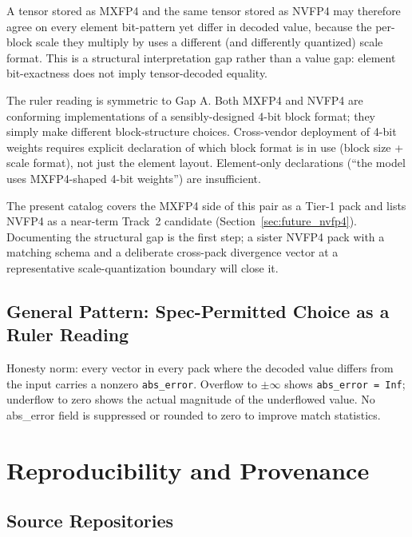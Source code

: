\documentclass[11pt,letterpaper]{article}
\begin{document}
A tensor stored as MXFP4 and the same tensor stored as NVFP4 may therefore
agree on every element bit-pattern yet differ in decoded value, because the
per-block scale they multiply by uses a different (and differently quantized)
scale format.  This is a structural interpretation gap rather than a value
gap: element bit-exactness does not imply tensor-decoded equality.

The ruler reading is symmetric to Gap A.  Both MXFP4 and NVFP4 are conforming
implementations of a sensibly-designed 4-bit block format; they simply make
different block-structure choices.  Cross-vendor deployment of 4-bit weights
requires explicit declaration of which block format is in use (block size +
scale format), not just the element layout.  Element-only declarations (``the
model uses MXFP4-shaped 4-bit weights'') are insufficient.

The present catalog covers the MXFP4 side of this pair as a Tier-1 pack and
lists NVFP4 as a near-term Track~2 candidate (Section~\ref{sec:future_nvfp4}).
Documenting the structural gap is the first step; a sister NVFP4 pack with
a matching schema and a deliberate cross-pack divergence vector at a
representative scale-quantization boundary will close it.

\subsection{General Pattern: Spec-Permitted Choice as a Ruler Reading}
\label{sec:general_pattern}

Honesty norm: every vector in every pack where the decoded value differs from
the input carries a nonzero \texttt{abs\_error}.  Overflow to $\pm\infty$ shows
\texttt{abs\_error = Inf}; underflow to zero shows the actual magnitude of the
underflowed value.  No abs\_error field is suppressed or rounded to zero to
improve match statistics.

\section{Reproducibility and Provenance}
\label{sec:repro}

\subsection{Source Repositories}
\end{document}
